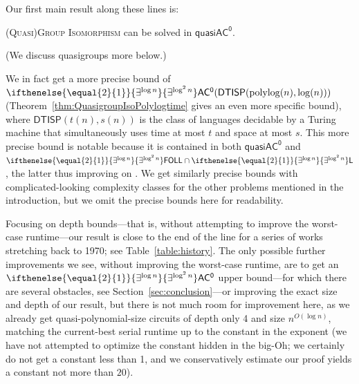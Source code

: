 \documentclass{theoretics}
\newcommand{\algprobm}[1]{\textsc{#1}\xspace}
\newcommand{\betacc}[1]{\ifthenelse{\equal{#1}{1}}{\exists^{\log n}}{\exists^{\log^{#1}n}}} %
\newcommand{\Oh}{O}
\newcommand*{\ComplexityClass}[1]{\ensuremath{\mathsf{#1}}\xspace}
\newcommand{\DTISP}{\ComplexityClass{DTISP}}
\newcommand{\DTISPpll}{\ensuremath{\DTISP(\mathrm{polylog}(n),\mathrm{log}(n))}\xspace}
\newcommand*{\LogSpace}{\ComplexityClass{L}}
\newcommand{\ACz}{\ComplexityClass{AC^0}}
\newcommand{\qACz}{\ComplexityClass{quasiAC^0}}
\newcommand{\FOLL}{\ComplexityClass{FOLL}}
\begin{document}
Our first main result along these lines is:

\begin{theorem}
\algprobm{(Quasi)Group Isomorphism} can be solved in $\qACz$.
\end{theorem}

(We discuss quasigroups more below.) 

\begin{remark}
We in fact get a more precise bound of $\betacc{2}\ACz(\DTISPpll)$ (Theorem~\ref{thm:QuasigroupIsoPolylogtime} gives an even more specific bound), where $\mathsf{DTISP}(t(n),s(n))$ is the class of languages decidable by a Turing machine that simultaneously uses time at most $t$ and space at most $s$. This more precise bound is notable because it is contained in both $\qACz$ and $\betacc{2}\FOLL \cap \betacc{2} \LogSpace$, the latter thus improving on \cite{ChattopadhyayToranWagner}. We get similarly precise bounds with complicated-looking complexity classes for the other problems mentioned in the introduction, but we omit the precise bounds here for readability.
\end{remark}

  Focusing on depth bounds---that is, without attempting to improve the worst-case runtime---our result is close to the end of the line for a series of works stretching back to 1970; see Table~\ref{table:history}. The only possible further improvements we see, without improving the worst-case runtime, are to get an $\betacc{2}\ACz$ upper bound---for which there are several obstacles, see Section~\ref{sec:conclusion}---or improving the exact size and depth of our result, but there is not much room for improvement here, as we already get quasi-polynomial-size circuits of depth only 4 and size $n^{\Oh(\log n)}$, matching the current-best serial runtime up to the constant in the exponent (we have not attempted to optimize the constant hidden in the big-Oh; we certainly do not get a constant less than 1, and we conservatively estimate our proof yields a constant not more than $20$).
\end{document}
